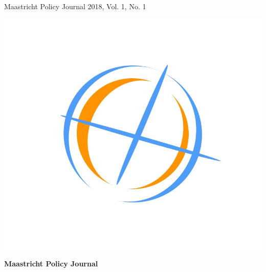 \documentclass[journal,noindent,headline,12pt]{paper}
\begin{document}
\begin{titlepage} 
\begin{center}
{\huge\sf Maastricht Policy Journal} \vfill
{\Large 2018, Vol. 1, No. 1} \vfill
\begin{center}
	\includegraphics[scale=0.20]{logo1}
\end{center}
{\large\bf Maastricht Policy Journal}
\end{center} 
\end{titlepage}
\journalcontents

\onecolumn

{}



\journalpart[Acknowledgements]{}



{}



%



\newpage
\bigskip

\end{document}

